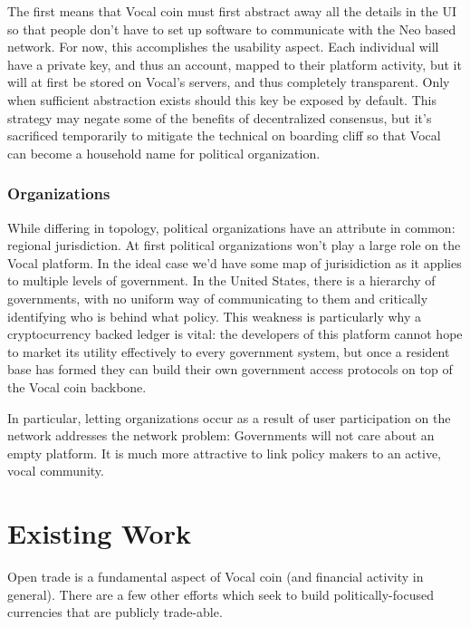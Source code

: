 \documentclass[conference]{IEEEtran}
\begin{document}
    The first means that Vocal coin must first abstract away all the details in the UI so that people don't have to set up software to communicate with the Neo based network. For now, this accomplishes the usability aspect. Each individual will have a private key, and thus an account, mapped to their platform activity, but it will at first be stored on Vocal's servers, and thus completely transparent. Only when sufficient abstraction exists should this key be exposed by default. This strategy may negate some of the benefits of decentralized consensus, but it's sacrificed temporarily to mitigate the technical on boarding cliff so that Vocal can become a household name for political organization.


    \subsubsection{Organizations}
    While differing in topology, political organizations have an attribute in common: regional jurisdiction. At first political organizations won't play a large role on the Vocal platform. In the ideal case we'd have some map of jurisidiction as it applies to multiple levels of government. In the United States, there is a hierarchy of governments, with no uniform way of communicating to them and critically identifying who is behind what policy. This weakness is particularly why a cryptocurrency backed ledger is vital: the developers of this platform cannot hope to market its utility effectively to every government system, but once a resident base has formed they can build their own government access protocols on top of the Vocal coin backbone.

    In particular, letting organizations occur as a result of user participation on the network addresses the network problem: Governments will not care about an empty platform. It is much more attractive to link policy makers to an active, vocal community. 


    \section{Existing Work}
    Open trade is a fundamental aspect of Vocal coin (and financial activity in general). There are a few other efforts which seek to build politically-focused currencies that are publicly trade-able.
\end{document}
